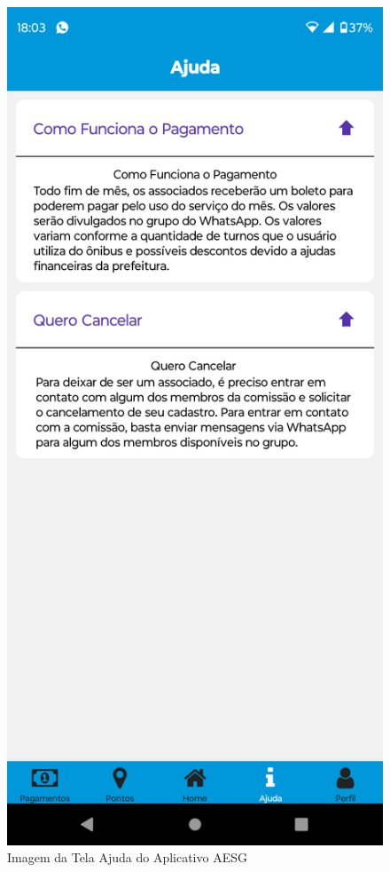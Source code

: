 \documentclass[
    12pt,                   %
    openright,              %
    oneside,                %
    a4paper,                %
    sumario=tradicional,    %
    english,                %
    brazil,                 %
    ]{abntex2}
\begin{document}
\begin{figure}[!h]
\begin{minipage}{0.5\textwidth}
                \end{minipage}%
                \begin{minipage}{0.5\textwidth}
                    \centering
                    \includegraphics[width=0.8\linewidth]{Imagens/App Images User/AUAjuda2.png}
                    \caption[Imagem da Tela Ajuda do Aplicativo AESG]{ 
                    Imagem da Tela Ajuda do Aplicativo AESG}
                    \label{fig:AppTelaAjuda2}
                \end{minipage}
            \end{figure}
            
\end{document}
